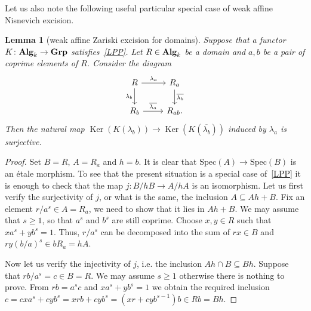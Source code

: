 \documentclass[oneside, 11pt]{amsart}
\numberwithin{equation}{section}
\newtheorem{lemma}{Lemma} \numberwithin{lemma}{section}
\newcommand{\Ker}{\mathop{\mathrm{Ker}}\nolimits}
\theoremstyle{definition}
\theoremstyle{definition}
\theoremstyle{remark}
\newcommand{\catname}[1]{{\normalfont\textbf{#1}}} %
\begin{document}
Let us also note the following useful particular special case of weak affine Nisnevich excision.
\begin{lemma}[weak affine Zariski excision for domains]
	\label{zgl} Suppose that a functor $K\colon \catname{Alg}_k \to \catname{Grp}$ satisfies~\ref{LPP}. Let $R \in \catname{Alg}_k$ be a domain and $a, b$ be a pair of coprime elements of $R$. Consider the diagram
$$\begin{tikzcd}
	R \ar{r}{\lambda_a} \ar{d}[swap]{\lambda_b} & R_a \ar{d}{\overline{\lambda_b}}\\
	R_b \ar{r}{\overline{\lambda_a}} & R_{ab}.
\end{tikzcd}$$
	Then the natural map $\Ker(K(\lambda_b)) \to \Ker(K(\overline{\lambda_b}))$ induced by $\lambda_a$ is surjective.
\end{lemma}
\begin{proof}
	Set $B=R$, $A=R_a$ and $h=b$. It is clear that $\mathrm{Spec}(A)\to\mathrm{Spec}(B)$ is an {\'e}tale morphism. To see that the present situation is a special case of~\ref{LPP} it is enough to  check that the map $j\colon B/hB \to A/hA$ is an isomorphism. Let us first verify the surjectivity of $j$, or what is the same, the inclusion $A \subseteq Ah+B$. Fix an element $r/a^s\in A=R_a$, we need to show that it lies in $Ah+B$. We may assume that $s\geq 1$, so that $a^s$ and $b^s$ are still coprime. Choose $x, y \in R$ such that $xa^s+yb^s=1$. Thus, $r/a^s$ can be decomposed into the sum of $rx\in B$ and $ry(b/a)^s\in bR_a=hA$.

	Now let us verify the injectivity of $j$, i.e. the inclusion $Ah\cap B \subseteq Bh$. Suppose that $rb/a^s=c\in B=R$. We may assume $s\geq 1$ otherwise there is nothing to prove. From $rb=a^sc$ and $xa^s+yb^s=1$ we obtain the required inclusion $c=cxa^s+cyb^s=xrb+cyb^s=(xr+cyb^{s-1})b \in Rb = Bh$. 
\end{proof}
\end{document}
